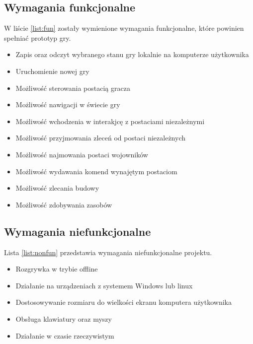 \subsection{Wymagania funkcjonalne}\label{ss:fun}
W liście \ref{list:fun} zostały wymienione wymagania funkcjonalne, które powinien spełniać prototyp gry.
\begin{itemize}\label{list:fun}
  \item Zapis oraz odczyt wybranego stanu gry lokalnie na komputerze użytkownika
  \item Uruchomienie nowej gry
  \item Możliwość sterowania postacią gracza
  \item Możliwość nawigacji w świecie gry
  \item Możliwość wchodzenia w interakjcę z postaciami niezależnymi
  \item Możliwość przyjmowania zleceń od postaci niezależnych
  \item Możliwość najmowania postaci wojowników
  \item Możliwość wydawania komend wynajętym postaciom
  \item Możliwość zlecania budowy
  \item Możliwość zdobywania zasobów
\end{itemize}

\subsection{Wymagania niefunkcjonalne}\label{ss:nonfun}
Lista \ref{list:nonfun} przedstawia wymagania niefunkcjonalne projektu.
\begin{itemize}\label{list:nonfun}
  \item Rozgrywka w trybie offline
  \item Działanie na urządzeniach z systemem Windows lub linux
  \item Dostosowywanie rozmiaru do wielkości ekranu komputera użytkownika
  \item Obsługa klawiatury oraz myszy
  \item Działanie w czasie rzeczywistym
\end{itemize}


